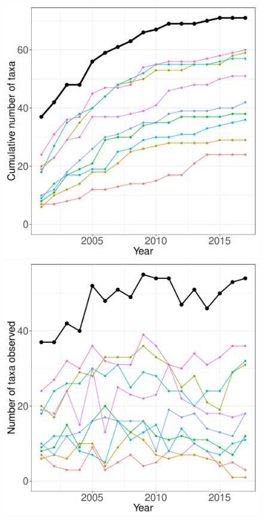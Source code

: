 \documentclass[11pt, oneside]{article}
\begin{document}
\begin{figure}[h!]
\centering
\includegraphics[scale = 0.4]{sbc-sessileInverts-castorani_species_accumulation_curve.pdf}
\includegraphics[scale = 0.4]{sbc-sessileInverts-castorani_num_taxa_over_time.pdf}

\end{figure}
\end{document}
